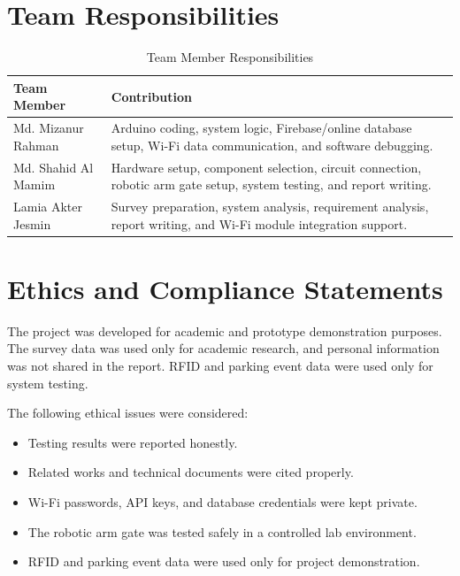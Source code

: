 \section{Team Responsibilities}

\begin{table}[H]
\centering
\small
\renewcommand{\arraystretch}{1.15}
\caption{Team Member Responsibilities}
\label{tab:team_responsibilities}
\begin{tabular}{|p{4cm}|p{9cm}|}
\hline
\textbf{Team Member} & \textbf{Contribution} \\
\hline
Md. Mizanur Rahman & Arduino coding, system logic, Firebase/online database setup, Wi-Fi data communication, and software debugging. \\
\hline
Md. Shahid Al Mamim & Hardware setup, component selection, circuit connection, robotic arm gate setup, system testing, and report writing. \\
\hline
Lamia Akter Jesmin & Survey preparation, system analysis, requirement analysis, report writing, and Wi-Fi module integration support. \\
\hline
\end{tabular}
\normalsize
\end{table}

\section{Ethics and Compliance Statements}

The project was developed for academic and prototype demonstration purposes. The survey data was used only for academic research, and personal information was not shared in the report. RFID and parking event data were used only for system testing.

The following ethical issues were considered:

\begin{itemize}
    \item Testing results were reported honestly.
    \item Related works and technical documents were cited properly.
    \item Wi-Fi passwords, API keys, and database credentials were kept private.
    \item The robotic arm gate was tested safely in a controlled lab environment.
    \item RFID and parking event data were used only for project demonstration.
\end{itemize}

